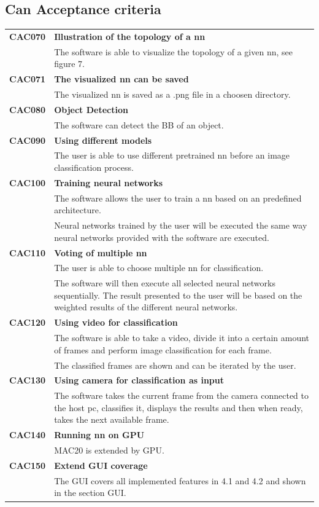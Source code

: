 \documentclass[parskip=full]{scrartcl}
\begin{document}
\subsection{Can Acceptance criteria}
\begin{tabular}{p{2cm}p{12cm}}
\textbf{CAC070} & \textbf{Illustration of the topology of a nn} \\
& The software is able to visualize the topology of a given \gls{nn}, see figure 7. \\
\textbf{CAC071} & \textbf{The visualized nn can be saved}\\
& The visualized nn is saved as a .png file in a choosen directory.\\
\textbf{CAC080} & \textbf{Object Detection} \\
& The software can detect the BB of an object. \\ 
\textbf{CAC090} &  \textbf{Using different models}\\
& The user is able to use different pretrained \gls{nn} before an image classification process. \\
\textbf{CAC100} & \textbf{Training neural networks} \\
& The software allows the user to train a \gls{nn} based on an predefined architecture.\\
& Neural networks trained by the user will be executed the same way neural networks provided with the software are executed.\\
\textbf{CAC110} & \textbf{Voting of multiple nn} \\
& The user is able to choose multiple nn for classification.\\
& The software will then execute all selected neural networks sequentially. The result presented to the user will be based on the weighted results of the different neural networks.\\
\textbf{CAC120} & \textbf{Using video for classification} \\
& The software is able to take a video, divide it into a certain amount of frames and perform image classification for each frame.\\
& The classified frames are shown and can be iterated by the user. \\
\textbf{CAC130} & \textbf{Using camera for classification as input} \\
& The software takes the current frame from the camera connected to the host pc, classifies it, displays the results and then when ready, takes the next available frame.\\
\textbf{CAC140} & \textbf{Running \gls{nn} on GPU}\\
& MAC20 is extended by GPU.\\
\textbf{CAC150} & \textbf{Extend GUI coverage}\\
& The GUI covers all implemented features in 4.1 and 4.2 and shown in the section GUI.
\end{tabular}
\end{document}
